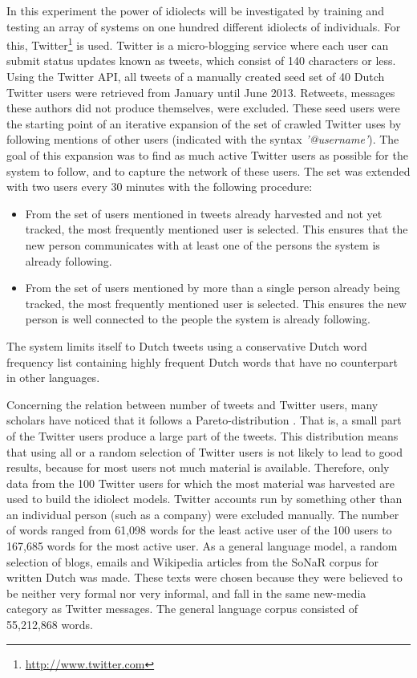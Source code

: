 \documentclass[12pt]{article}
\begin{document}
In this experiment the power of idiolects will be investigated by training and testing an array of systems on one hundred different idiolects of individuals. For this, Twitter\footnote{\url{http://www.twitter.com}} is used. Twitter is a micro-blogging service where each user can submit status updates known as tweets, which consist of 140 characters or less. Using the Twitter API, all tweets of a manually created seed set of 40 Dutch Twitter users were retrieved from January until June 2013. Retweets, messages these authors did not produce themselves, were excluded. These seed users were the starting point of an iterative expansion of the set of crawled Twitter uses by following mentions of other users (indicated with the syntax \emph{'@username'}). The goal of this expansion was to find as much active Twitter users as possible for the system to follow, and to capture the network of these users. The set was extended with two users every 30 minutes with the following procedure:

\begin{itemize}
\item From the set of users mentioned in tweets already harvested and not yet tracked, the most frequently mentioned user is selected. This ensures that the new person communicates with at least one of the persons the system is already following.
\item From the set of users mentioned by more than a single person already being tracked, the most frequently mentioned user is selected. This ensures the new person is well connected to the people the system is already following.
\end{itemize}

The system limits itself to Dutch tweets using a conservative Dutch word frequency list containing highly frequent Dutch words that have no counterpart in other languages.

Concerning the relation between number of tweets and Twitter users, many scholars have noticed that it follows a Pareto-distribution \cite{heil+09,asur+10,rui+12}. That is, a small part of the Twitter users produce a large part of the tweets. 
This distribution means that using all or a random selection of Twitter users is not likely to lead to good results, because for most users not much material is available. Therefore, only data from the 100 Twitter users for which the most material was harvested are used to build the idiolect models. Twitter accounts run by something other than an individual person (such as a company) were excluded manually. The number of words ranged from 61,098 words for the least active user of the 100 users to 167,685 words for the most active user. As a general language model, a random selection of blogs, emails and Wikipedia articles from the SoNaR corpus for written Dutch \cite{oostdijk+13} was made. These texts were chosen because they were believed to be neither very formal nor very informal, and fall in the same new-media category as Twitter messages. The general language corpus consisted of 55,212,868 words.
\end{document}
